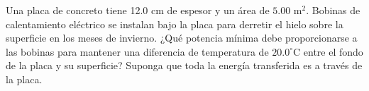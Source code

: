\item Una placa de concreto tiene 12.0 cm de espesor y un área de $5.00\text{ m}^2$. Bobinas de calentamiento eléctrico se instalan bajo la placa para derretir el hielo sobre la superficie en los meses de invierno. ¿Qué potencia mínima debe proporcionarse a las bobinas para mantener una diferencia de temperatura de $20.0^\circ\text{C}$ entre el fondo de la placa y su superficie? Suponga que toda la energía transferida es a través de la placa.
